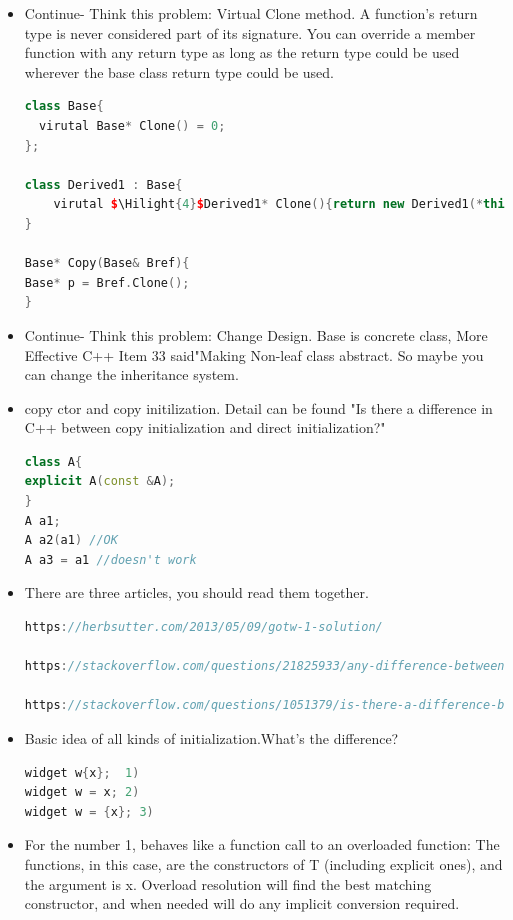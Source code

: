 \documentclass[a4paper,12pt,twoside]{book}
\newcommand{\Hilight}[1]{\makebox[0pt][l]{\color{yellow}\rule[-3pt]{#1em}{11pt}}}
\begin{document}
\begin{itemize}
\item Continue- Think this problem: Virtual Clone method.
A function's return type is never considered part of its signature. You can override a member
function with any return type as long as the return type could be used wherever the base class
return type could be used.
\begin{lstlisting}[frame=single, language=c++, mathescape=true]
class Base{
  virutal Base* Clone() = 0;
};

class Derived1 : Base{
    virutal $\Hilight{4}$Derived1* Clone(){return new Derived1(*this);}
}

Base* Copy(Base& Bref){
Base* p = Bref.Clone();
}
\end{lstlisting}


\item Continue- Think this problem: Change Design. Base is concrete class,  More Effective C++ Item 33 said"Making Non-leaf class abstract. So maybe you can change the inheritance system.

\item copy ctor and copy initilization. Detail can be found "Is there a difference in C++ between copy initialization and direct initialization?"
\begin{lstlisting}[frame=single, language=c++]
class A{
explicit A(const &A);
}
A a1;
A a2(a1) //OK
A a3 = a1 //doesn't work
\end{lstlisting}

\item There are three articles, you should read them together.
\begin{lstlisting}[frame=single, language=c++]
https://herbsutter.com/2013/05/09/gotw-1-solution/

https://stackoverflow.com/questions/21825933/any-difference-between-copy-list-initialization-and-traditional-copy-initializat

https://stackoverflow.com/questions/1051379/is-there-a-difference-between-copy-initialization-and-direct-initialization
\end{lstlisting}

\item Basic idea of all kinds of initialization.What's the difference?
\begin{lstlisting}[frame=single, language=c++]
widget w{x};  1)
widget w = x; 2)
widget w = {x}; 3)
\end{lstlisting}
\item For the number 1, behaves like a function call to an overloaded function: The functions, in this case, are the constructors of T (including explicit ones), and the argument is x. Overload resolution will find the best matching constructor, and when needed will do any implicit conversion required.


\end{itemize}
\end{document}
